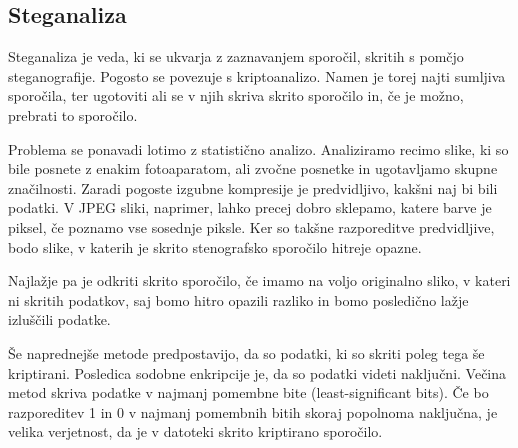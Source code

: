\subsection{Steganaliza}
    Steganaliza je veda, ki se ukvarja z zaznavanjem sporočil, skritih s pomčjo steganografije. Pogosto se povezuje s kriptoanalizo. Namen je torej najti sumljiva sporočila, ter ugotoviti ali se v njih skriva skrito sporočilo in, če je možno, prebrati to sporočilo.

    Problema se ponavadi lotimo z statistično analizo. Analiziramo recimo slike, ki so bile posnete z enakim fotoaparatom, ali zvočne posnetke in ugotavljamo skupne značilnosti. Zaradi pogoste izgubne kompresije je predvidljivo, kakšni naj bi bili podatki. V JPEG sliki, naprimer, lahko precej dobro sklepamo, katere barve je piksel, če poznamo vse sosednje piksle. Ker so takšne razporeditve predvidljive, bodo slike, v katerih je skrito stenografsko sporočilo hitreje opazne.

    Najlažje pa je odkriti skrito sporočilo, če imamo na voljo originalno sliko, v kateri ni skritih podatkov, saj bomo hitro opazili razliko in bomo posledično lažje izluščili podatke.

    Še naprednejše metode predpostavijo, da so podatki, ki so skriti poleg tega še kriptirani. Posledica sodobne enkripcije je, da so podatki videti naključni. Večina metod skriva podatke v najmanj pomembne bite (least-significant bits). Če bo razporeditev 1 in 0 v najmanj pomembnih bitih skoraj popolnoma naključna, je velika verjetnost, da je v datoteki skrito kriptirano sporočilo.
